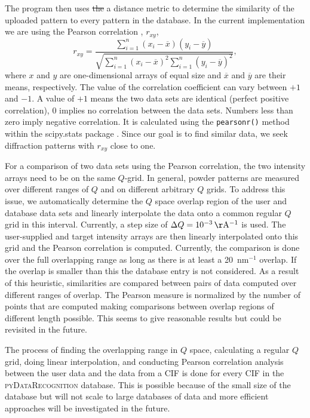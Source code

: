 \documentclass[preprint]{iucr}
\newcommand{\pydr}{\textsc{pyDataRecognition}\xspace}
\providecommand{\DIFdel}[1]{{\protect\color{red}\sout{#1}}}                      %
\providecommand{\DIFdelbegin}{} %
\providecommand{\DIFdelend}{} %
\newcommand{\DIFscaledelfig}{0.5}
\newlength{\DIFdelgraphicswidth} %
\newlength{\DIFdelgraphicsheight} %
\newcommand{\DIFdelincludegraphics}[2][]{%
\sbox{\DIFdelgraphicsbox}{\DIFOincludegraphics[#1]{#2}}%
\settoboxwidth{\DIFdelgraphicswidth}{\DIFdelgraphicsbox} %
\settoboxtotalheight{\DIFdelgraphicsheight}{\DIFdelgraphicsbox} %
\scalebox{\DIFscaledelfig}{%
\parbox[b]{\DIFdelgraphicswidth}{\usebox{\DIFdelgraphicsbox}\\[-\baselineskip] \rule{\DIFdelgraphicswidth}{0em}}\llap{\resizebox{\DIFdelgraphicswidth}{\DIFdelgraphicsheight}{%
\setlength{\unitlength}{\DIFdelgraphicswidth}%
\begin{picture}(1,1)%
\thicklines\linethickness{2pt} %
{\color[rgb]{1,0,0}\put(0,0){\framebox(1,1){}}}%
{\color[rgb]{1,0,0}\put(0,0){\line( 1,1){1}}}%
{\color[rgb]{1,0,0}\put(0,1){\line(1,-1){1}}}%
\end{picture}%
}\hspace*{3pt}}} %
} %
\DeclareRobustCommand{\DIFdelbegin}{\DIFOdelbegin \let\includegraphics\DIFdelincludegraphics} %
\DeclareRobustCommand{\DIFdelend}{\DIFOaddend \let\includegraphics\DIFOincludegraphics} %
\begin{document}
The program then uses \DIFdelbegin \DIFdel{the }\DIFdelend a distance metric to determine the similarity of the uploaded pattern to every pattern in the database.   In the current implementation we are using the Pearson correlation \cite{ pearsonVIINoteRegression1895}, $r_{xy}$,
\begin{equation}
    r_{xy} = \dfrac{\sum\limits_{i=1}^{n}(x_{i}-\overline{x})(y_{i}-\overline{y})}{\sqrt{\sum\limits_{i=1}^{n} (x_{i}-\overline{x})^{2}\sum\limits_{i=1}^{n}(y_{i}-\overline{y})^{2}}},
\end{equation}
where $x$ and $y$ are one-dimensional arrays of equal size and $\overline{x}$ and $\overline{y}$ are their means, respectively. The value of the correlation coefficient can vary between $+1$ and $-1$. A  value of $+1$ means the two data sets are identical (perfect positive correlation), 0 implies no correlation between the data sets. Numbers less than zero imply negative correlation. It is calculated using the \texttt{pearsonr()} method within the scipy.stats package \cite{virtanenSciPyFundamentalAlgorithms2020b}. Since our goal is to find similar data, we seek diffraction patterns with $r_{xy}$ close to one.

For a comparison of two data sets using the Pearson correlation, the two intensity arrays need to be on the same $Q$-grid. In general, powder patterns are measured over different ranges of $Q$ and on different arbitrary $Q$ grids.  To address this issue, we automatically determine the $Q$ space overlap region of the user and database data sets
and linearly interpolate the data onto a common regular $Q$ grid in this interval. 
Currently, a step size of $\Delta Q=10^{-3}\,\mathrm{\AA^{-1}}$ is used.  The user-supplied and target intensity arrays are then linearly interpolated onto this grid and the Pearson correlation is computed.  
Currently, the comparison is done over the full overlapping range as long as there is at least a 20~nm$^{-1}$ overlap.  If the overlap is smaller than this the database entry is not considered.  As a result of this heuristic, similarities are compared between pairs of data computed over different ranges of overlap. The Pearson measure is normalized by the number of points that are computed making comparisons between overlap regions of different length possible. This seems to give reasonable results but could be revisited in the future. 

The process of finding the overlapping range in $Q$ space, calculating a regular $Q$ grid, doing linear interpolation, and conducting Pearson correlation analysis between the user data and the data from a CIF is done for every CIF in the \pydr database. 
This is possible because of the small size of the database but will not scale to large databases of data and more efficient approaches will be investigated in the future.
\end{document}

